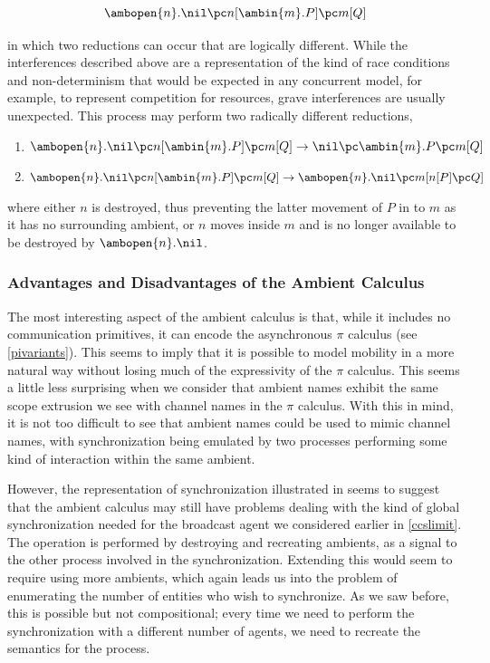 \begin{equation}
\ambopen{n}.\nil \pc n[\ambin{m}.P] \pc m[Q]
\end{equation}

\noindent in which two reductions can occur that are logically
different.  While the interferences described above are a
representation of the kind of race conditions and non-determinism that
would be expected in any concurrent model, for example, to represent
competition for resources, grave interferences are usually unexpected.
This process may perform two radically different reductions,

\begin{enumerate}
\item $\ambopen{n}.\nil \pc n[\ambin{m}.P] \pc m[Q] \rightarrow \nil \pc \ambin{m}.P \pc m[Q]$
\item $\ambopen{n}.\nil \pc n[\ambin{m}.P] \pc m[Q] \rightarrow \ambopen{n}.\nil \pc m[n[P] \pc Q]$
\end{enumerate}

\noindent where either $n$ is destroyed, thus preventing the latter
movement of $P$ in to $m$ as it has no surrounding ambient, or $n$
moves inside $m$ and is no longer available to be destroyed by
$\ambopen{n}.\nil$.

\subsubsection{Advantages and Disadvantages of the Ambient Calculus}

The most interesting aspect of the ambient calculus is that, while it
includes no communication primitives, it can encode the asynchronous
$\pi$ calculus (see \ref{pivariants}).  This seems to imply that it is
possible to model mobility in a more natural way without losing much of
the expressivity of the $\pi$ calculus.  This seems a little less
surprising when we consider that ambient names exhibit the same scope
extrusion we see with channel names in the $\pi$ calculus.  With this in
mind, it is not too difficult to see that ambient names could be used to
mimic channel names, with synchronization being emulated by two
processes performing some kind of interaction within the same ambient.

However, the representation of synchronization illustrated in \cite{amb}
seems to suggest that the ambient calculus may still have problems
dealing with the kind of global synchronization needed for the broadcast
agent we considered earlier in \ref{ccslimit}.  The operation is
performed by destroying and recreating ambients, as a signal to the
other process involved in the synchronization.  Extending this would
seem to require using more ambients, which again leads us into the
problem of enumerating the number of entities who wish to synchronize.
As we saw before, this is possible but not compositional; every time we
need to perform the synchronization with a different number of agents,
we need to recreate the semantics for the process.

